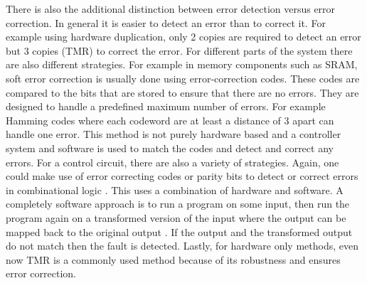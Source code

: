 \documentclass[12pt]{report}
\begin{document}
There is also the additional distinction between error detection versus error correction.  In general it is easier to detect an error than to correct it.  For example using hardware duplication, only 2 copies are required to detect an error but 3 copies (TMR) to correct the error.  For different parts of the system there are also different strategies.  For example in memory components such as SRAM, soft error correction is usually done using error-correction codes.  These codes are compared to the bits that are stored to ensure that there are no errors.  They are designed to handle a predefined maximum number of errors.  For example Hamming codes where each codeword are at least a distance of 3 apart can handle one error.  This method is not purely hardware based and a controller system and software is used to match the codes and detect and correct any errors.  For a control circuit, there are also a variety of strategies.  Again, one could make use of error correcting codes or parity bits to detect or correct errors in combinational logic \cite{McCluskey_99}.  This uses a combination of hardware and software.  A completely software approach is to run a program on some input, then run the program again on a transformed version of the input where the output can be mapped back to the original output \cite{Mitra_softwareerror}.  If the output and the transformed output do not match then the fault is detected.  Lastly, for hardware only methods, even now TMR is a commonly used method because of its robustness and ensures error correction. \\
\end{document}
